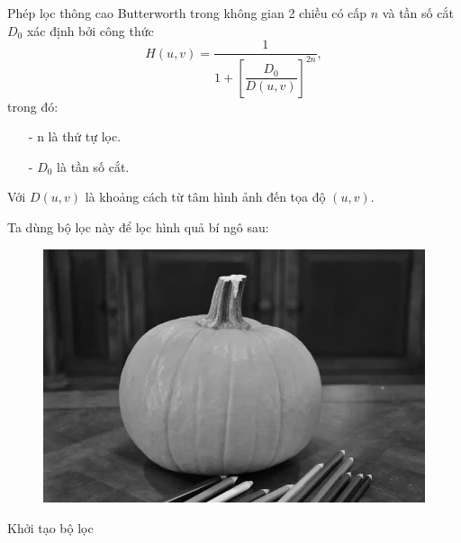 \documentclass[12pt,a4paper]{report}
\numberwithin{equation}{section}
\theoremstyle{definition} %
\begin{document}
Phép lọc thông cao Butterworth trong không gian 2 chiều có cấp $n$ và tần số cắt $D_0$ xác định bởi công thức
\begin{equation}
H(u,v) = \frac{1}{1 + \left[\dfrac{D_0}{D(u,v)}\right]^{2n}},
\end{equation}
trong đó: 
\begin{enumerate}
	\item[-] n là thứ tự lọc.
	\item[-] $D_0$ là tần số cắt.

\end{enumerate}
Với $D(u,v)$ là khoảng cách từ tâm hình ảnh đến tọa độ $(u,v)$.

Ta dùng bộ lọc này để lọc hình quả bí ngô sau:

\begin{figure}[H]
\centering
\includegraphics[width=0.8\linewidth]{img/pumpkin.png}
\caption{}
\label{fig136}
\end{figure}
Khởi tạo bộ lọc
\end{document}
